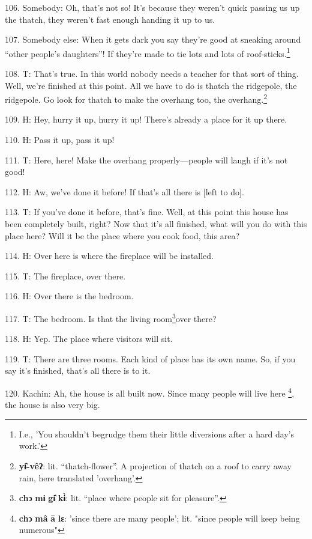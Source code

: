 106. Somebody: Oh, that's not so! It's because they weren't quick passing us up
the thatch, they weren't fast enough handing it up to us.

107. Somebody else: When it gets dark you say they're good at sneaking around ``other
people's daughters''! If they're made to tie lots and lots of roof-sticks.\footnote{I.e., 'You shouldn't begrudge them their little diversions after a hard day's work.'}

108. T: That's true. In this world nobody needs a teacher for that sort of thing.
Well, we're finished at this point. All we have to do is thatch the ridgepole,
the ridgepole. Go look for thatch to make the overhang too, the overhang.\footnote{\textbf{yɨ̂-vêʔ}: lit. ``thatch-flower''. A projection of thatch on a roof to carry away rain, here translated 'overhang'.}

109. H: Hey, hurry it up, hurry it up! There's already a place for it up there.

110. H: Pass it up, pass it up!

111. T: Here, here! Make the overhang properly---people will laugh if it's not
good!

112. H: Aw, we've done it before! If that's all there is [left to do].

113. T: If you've done it before, that's fine. Well, at this point this house has
been completely built, right? Now that it's all finished, what will you do with
this place here? Will it be the place where you cook food, this area?

114. H: Over here is where the fireplace will be installed.

115. T: The fireplace, over there.

116. H: Over there is the bedroom.

117. T: The bedroom. Is that the living room\footnote{\textbf{chɔ} \textbf{mɨ} \textbf{gɨ̂} \textbf{kɨ̀}: lit. ``place where people sit for pleasure''.}over there?

118. H: Yep. The place where visitors will sit.

119. T: There are three rooms. Each kind of place has its own name. So, if you
say it's finished, that's all there is to it.

120. Kachin: Ah, the house is all built now. Since many people will live here
\footnote{\textbf{chɔ} \textbf{mâ} \textbf{ā} \textbf{lɛ}: 'since there are many people'; lit. "since people will keep being numerous"}, the house is also very big.

